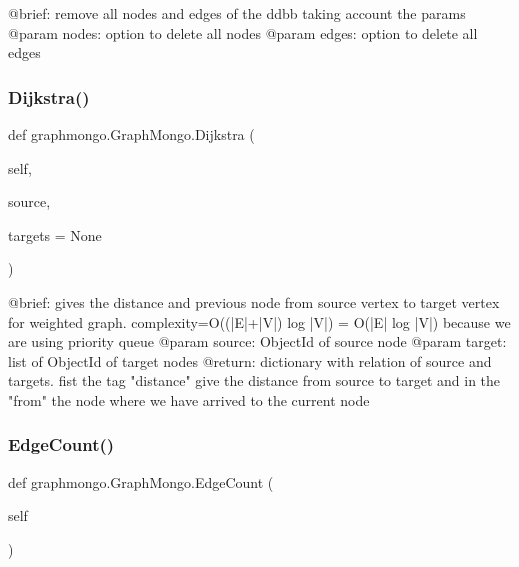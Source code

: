 \begin{DoxyVerb}@brief: remove all nodes and edges of the ddbb taking account the params
@param nodes: option to delete all nodes
@param edges: option to delete all edges
\end{DoxyVerb}
 \hypertarget{classgraphmongo_1_1GraphMongo_ad12c35ce9e8081ae46d42a7d19a8c8f8}{}\label{classgraphmongo_1_1GraphMongo_ad12c35ce9e8081ae46d42a7d19a8c8f8} 
\subsubsection{\texorpdfstring{Dijkstra()}{Dijkstra()}}
{\footnotesize\ttfamily def graphmongo.\+Graph\+Mongo.\+Dijkstra (\begin{DoxyParamCaption}\item[{}]{self,  }\item[{}]{source,  }\item[{}]{targets = {\ttfamily None} }\end{DoxyParamCaption})}

\begin{DoxyVerb}@brief: gives the distance and previous node from source vertex to target vertex for weighted graph. complexity=O((|E|+|V|) log |V|) = O(|E| log |V|) because we are using priority queue
@param source: ObjectId of source node
@param target: list of ObjectId of target nodes
@return: dictionary with relation of source and targets. fist the tag "distance" give the distance from source to target and in the "from" the node where we have arrived to the current node
\end{DoxyVerb}
 \hypertarget{classgraphmongo_1_1GraphMongo_a9c655ca4e219d5578b20f2e232212f1b}{}\label{classgraphmongo_1_1GraphMongo_a9c655ca4e219d5578b20f2e232212f1b} 
\subsubsection{\texorpdfstring{Edge\+Count()}{EdgeCount()}}
{\footnotesize\ttfamily def graphmongo.\+Graph\+Mongo.\+Edge\+Count (\begin{DoxyParamCaption}\item[{}]{self }\end{DoxyParamCaption})}

